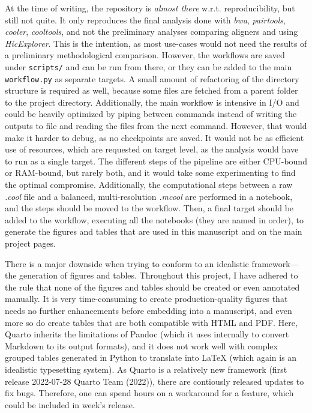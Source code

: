 \documentclass[
  11pt,
  a4paper,
]{scrbook}
\newcounter{none} %
\begin{document}
At the time of writing, the repository is \emph{almost there} w.r.t.
reproducibility, but still not quite. It only reproduces the final
analysis done with \emph{bwa}, \emph{pairtools}, \emph{cooler},
\emph{cooltools}, and not the preliminary analyses comparing aligners
and using \emph{HicExplorer}. This is the intention, as most use-cases
would not need the results of a preliminary methodological comparison.
However, the workflows are saved under \texttt{scripts/} and can be run
from there, or they can be added to the main \texttt{workflow.py} as
separate targets. A small amount of refactoring of the directory
structure is required as well, because some files are fetched from a
parent folder to the project directory. Additionally, the main workflow
is intensive in I/O and could be heavily optimized by piping between
commands instead of writing the outputs to file and reading the files
from the next command. However, that would make it harder to debug, as
no checkpoints are saved. It would not be as efficient use of resources,
which are requested on target level, as the analysis would have to run
as a single target. The different steps of the pipeline are either
CPU-bound or RAM-bound, but rarely both, and it would take some
experimenting to find the optimal compromise. Additionally, the
computational steps between a raw \emph{.cool} file and a balanced,
multi-resolution \emph{.mcool} are performed in a notebook, and the
steps should be moved to the workflow. Then, a final target should be
added to the workflow, executing all the notebooks (they are named in
order), to generate the figures and tables that are used in this
manuscript and on the main project pages.

There is a major downside when trying to conform to an idealistic
framework---the generation of figures and tables. Throughout this
project, I have adhered to the rule that none of the figures and tables
should be created or even annotated manually. It is very time-consuming
to create production-quality figures that needs no further enhancements
before embedding into a manuscript, and even more so do create tables
that are both compatible with HTML and PDF. Here, Quarto inherits the
limitations of Pandoc (which it uses internally to convert Markdown to
its output formats), and it does not work well with complex grouped
tables generated in Python to translate into LaTeX (which again is an
idealistic typesetting system). As Quarto is a relatively new framework
(first release 2022-07-28 Quarto Team (2022)), there are contiously
released updates to fix bugs. Therefore, one can spend hours on a
workaround for a feature, which could be included in week's release.
\end{document}
